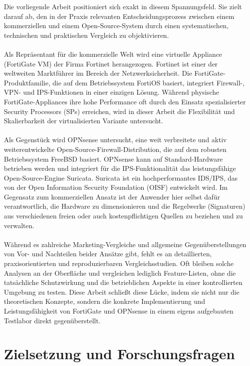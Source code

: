 Die vorliegende Arbeit positioniert sich exakt in diesem Spannungsfeld. Sie zielt darauf ab, den in der Praxis relevanten Entscheidungsprozess zwischen einem kommerziellen und einem Open-Source-System durch einen systematischen, technischen und praktischen Vergleich zu objektivieren.
\\\\
Als Repräsentant für die kommerzielle Welt wird eine virtuelle Appliance (FortiGate VM) der Firma Fortinet herangezogen. Fortinet ist einer der weltweiten Marktführer im Bereich der Netzwerksicherheit. Die FortiGate-Produktfamilie, die auf dem Betriebssystem FortiOS basiert, integriert Firewall-, VPN- und IPS-Funktionen in einer einzigen Lösung. Während physische FortiGate-Appliances ihre hohe Performance oft durch den Einsatz spezialisierter Security Processors (SPs) erreichen, wird in dieser Arbeit die Flexibilität und Skalierbarkeit der virtualisierten Variante untersucht.
\\\\
Als Gegenstück wird OPNsense untersucht, eine weit verbreitete und aktiv weiterentwickelte Open-Source-Firewall-Distribution, die auf dem robusten Betriebssystem FreeBSD basiert. OPNsense kann auf Standard-Hardware betrieben werden und integriert für die IPS-Funktionalität das leistungsfähige Open-Source-Engine Suricata. Suricata ist ein hochperformantes IDS/IPS, das von der Open Information Security Foundation (OISF) entwickelt wird. Im Gegensatz zum kommerziellen Ansatz ist der Anwender hier selbst dafür verantwortlich, die Hardware zu dimensionieren und die Regelwerke (Signaturen) aus verschiedenen freien oder auch kostenpflichtigen Quellen zu beziehen und zu verwalten.
\\\\
Während es zahlreiche Marketing-Vergleiche und allgemeine Gegenüberstellungen von Vor- und Nachteilen beider Ansätze gibt, fehlt es an detaillierten, praxisorientierten und reproduzierbaren Vergleichsstudien. Oft bleiben solche Analysen an der Oberfläche und vergleichen lediglich Feature-Listen, ohne die tatsächliche Schutzwirkung und die betrieblichen Aspekte in einer kontrollierten Umgebung zu testen. Diese Arbeit schließt diese Lücke, indem sie nicht nur die theoretischen Konzepte, sondern die konkrete Implementierung und Leistungsfähigkeit von FortiGate und OPNsense in einem eigens aufgebauten Testlabor direkt gegenüberstellt.

\section{Zielsetzung und Forschungsfragen}

